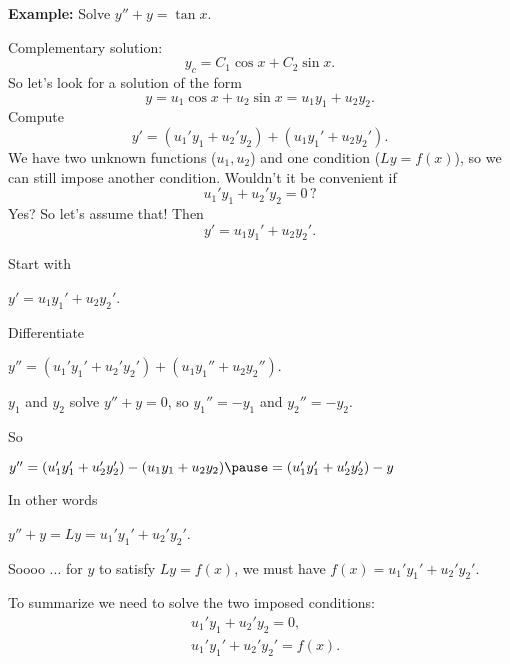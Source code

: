 \documentclass[10pt,aspectratio=169]{beamer}
\begin{document}
\begin{frame}
\textbf{Example:}
Solve $y''+y=\tan x$.

\medskip
\pause

Complementary solution:
\[
y_c = C_1 \cos x + C_2 \sin x .
\]
\pause
So let's look for a solution of the form
\[
y = u_1 \cos x + u_2 \sin x = u_1 y_1 + u_2 y_2 .
\]
\pause
Compute
\[
y' = (u_1' y_1 + u_2' y_2) + (u_1 y_1' + u_2 y_2').
\]
\pause
We have two unknown functions ($u_1,u_2$) and one condition ($Ly=f(x)$),
so we can still impose another condition.
\pause
Wouldn't it be convenient if
\[
u_1' y_1 + u_2' y_2 = 0 \, ?
\]
\pause
Yes?  So let's assume that!
\pause
Then
\[
y' = u_1 y_1' + u_2 y_2' .
\]

\end{frame}

\begin{frame}
Start with

\quad
$y' = u_1 y_1' + u_2 y_2'$.

\medskip
\pause

Differentiate

\quad
$y'' = (u_1' y_1' + u_2' y_2') + (u_1 y_1'' + u_2 y_2'')$.

\medskip
\pause

$y_1$ and $y_2$ solve $y''+y = 0$, so $y_1'' = - y_1$ and $y_2'' = - y_2$.

\medskip
\pause

So

\quad
$y'' =
(u_1' y_1' + u_2' y_2') - (u_1 y_1 + u_2 y_2) 
\pause
=
(u_1' y_1' + u_2' y_2') - y
$

\medskip
\pause

In other words

\quad
$y'' + y = Ly = u_1' y_1' + u_2' y_2'$.

\medskip

\pause
Soooo ...  for $y$ to satisfy $Ly = f(x)$, we must have
$f(x) = u_1' y_1' + u_2' y_2'$.

\medskip
\pause

To summarize we need to solve the two imposed conditions:
\[
\boxed{~~
\begin{aligned}
& u_1' y_1 + u_2' y_2 = 0 ,\\
& u_1' y_1' + u_2' y_2' = f(x) .
\end{aligned}
~~}
\]

\end{frame}
\end{document}
